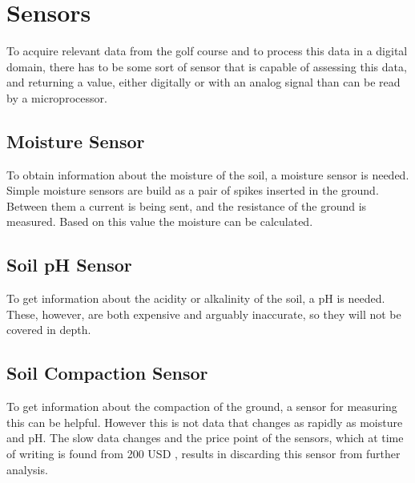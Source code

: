 \section{Sensors}
To acquire relevant data from the golf course and to process this data in a digital domain, there has to be some sort of sensor that is capable of assessing this data, and returning a value, either digitally or with an analog signal than can be read by a microprocessor.

\subsection{Moisture Sensor}
To obtain information about the moisture of the soil, a moisture sensor is needed. Simple moisture sensors are build as a pair of spikes inserted in the ground. Between them a current is being sent, and the resistance of the ground is measured. Based on this value the moisture can be calculated. %

\subsection{Soil pH Sensor}
To get information about the acidity or alkalinity of the soil, a pH is needed. These, however, are both expensive and arguably inaccurate, so they will not be covered in depth. 

\subsection {Soil Compaction Sensor}
To get information about the compaction of the ground, a sensor for measuring this can be helpful. However this is not data that changes as rapidly as moisture and pH. The slow data changes and the price point of the sensors, which at time of writing is found from 200 USD , results in discarding this sensor from further analysis.
